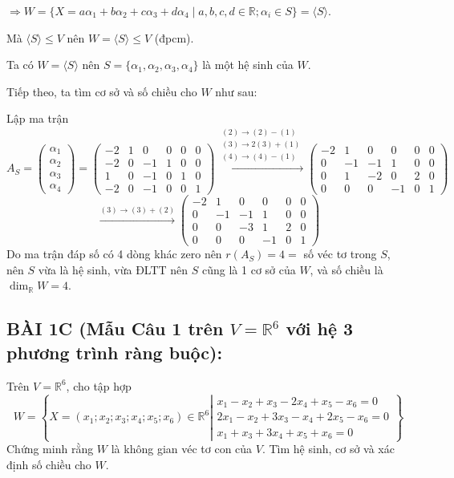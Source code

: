 \documentclass[12pt,a4paper]{article}
\newcommand{\R}{\mathbb{R}}
\begin{document}
$\Rightarrow W = \{ X = a\alpha_1 + b\alpha_2 + c\alpha_3 + d\alpha_4 \mid a, b, c, d \in \R; \alpha_i \in S \} = \langle S \rangle$.

Mà $\langle S \rangle \le V$ nên $W = \langle S \rangle \le V$ (đpcm).

Ta có $W = \langle S \rangle$ nên $S = \{ \alpha_1, \alpha_2, \alpha_3, \alpha_4 \}$ là một hệ sinh của $W$.

Tiếp theo, ta tìm cơ sở và số chiều cho $W$ như sau:

Lập ma trận
\[
A_S = \begin{pmatrix} \alpha_1 \\ \alpha_2 \\ \alpha_3 \\ \alpha_4 \end{pmatrix} = 
\begin{pmatrix} 
-2 & 1 & 0 & 0 & 0 & 0 \\ 
-2 & 0 & -1 & 1 & 0 & 0 \\ 
1 & 0 & -1 & 0 & 1 & 0 \\ 
-2 & 0 & -1 & 0 & 0 & 1 
\end{pmatrix}
\xrightarrow{\substack{(2) \to (2) - (1) \\ (3) \to 2(3) + (1) \\ (4) \to (4) - (1)}}
\begin{pmatrix} 
-2 & 1 & 0 & 0 & 0 & 0 \\ 
0 & -1 & -1 & 1 & 0 & 0 \\ 
0 & 1 & -2 & 0 & 2 & 0 \\ 
0 & 0 & 0 & -1 & 0 & 1 
\end{pmatrix}
\]
\[
\xrightarrow{(3) \to (3) + (2)}
\begin{pmatrix} 
-2 & 1 & 0 & 0 & 0 & 0 \\ 
0 & -1 & -1 & 1 & 0 & 0 \\ 
0 & 0 & -3 & 1 & 2 & 0 \\ 
0 & 0 & 0 & -1 & 0 & 1 
\end{pmatrix}
\]
Do ma trận đáp số có 4 dòng khác zero nên $r(A_S) = 4 = $ số véc tơ trong $S$, nên $S$ vừa là hệ sinh, vừa ĐLTT nên $S$ cũng là 1 cơ sở của $W$, và số chiều là $\dim_{\R} W = 4$.

\vspace{0.3cm}

\subsection*{BÀI 1C (Mẫu Câu 1 trên $V = \R^6$ với hệ 3 phương trình ràng buộc):}
Trên $V=\R^6$, cho tập hợp
\[
W = \left\{ X = (x_1; x_2; x_3; x_4; x_5; x_6) \in \R^6 \left| \begin{matrix} x_1 - x_2 + x_3 - 2x_4 + x_5 - x_6 = 0 \\ 2x_1 - x_2 + 3x_3 - x_4 + 2x_5 - x_6 = 0 \\ x_1 + x_3 + 3x_4 + x_5 + x_6 = 0 \end{matrix} \right. \right\}
\]
Chứng minh rằng $W$ là không gian véc tơ con của $V$. Tìm hệ sinh, cơ sở và xác định số chiều cho $W$.
\end{document}
